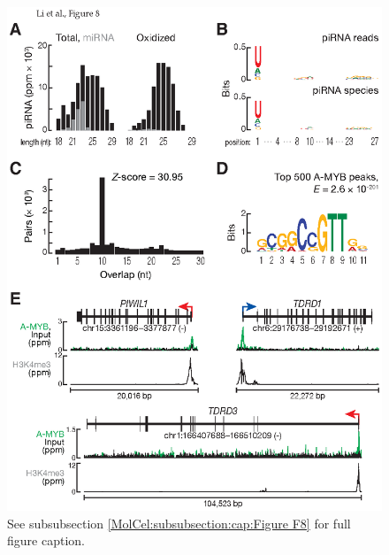     \begin{figure} %
      \centering 
      \includegraphics{Figures/MolCel/MolCel2013_Fig8.eps}
      \caption[Feed-Forward Regulation of piRNA Biogenesis by A-MYB is Conserved in Rooster]
      {
        See subsubsection \ref{MolCel:subsubsection:cap:Figure F8} for full figure caption.
      	}
      \label{MolCel:fig:MolCelF8}
    	\end{figure}
